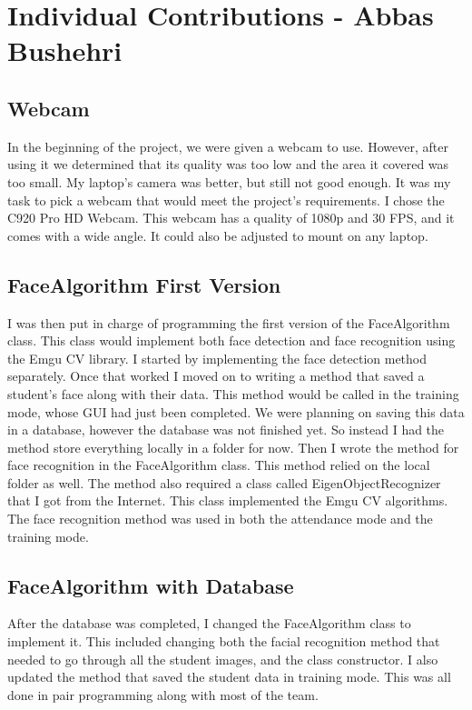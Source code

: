 \documentclass[12pt, a4paper]{article}
\begin{document}
\section{Individual Contributions - Abbas Bushehri}
\subsection{Webcam}
In the beginning of the project, we were given a webcam to use. However, after using it we determined that its quality was too low and the area it covered was too small. My laptop’s camera was better, but still not good enough. It was my task to pick a webcam that would meet the project’s requirements. I chose the C920 Pro HD Webcam. This webcam has a quality of 1080p and 30 FPS, and it comes with a wide angle. It could also be adjusted to mount on any laptop.

\subsection{FaceAlgorithm First Version}
I was then put in charge of programming the first version of the FaceAlgorithm class. This class would implement both face detection and face recognition using the Emgu CV library. I started by implementing the face detection method separately. Once that worked I moved on to writing a method that saved a student’s face along with their data. This method would be called in the training mode, whose GUI had just been completed. We were planning on saving this data in a database, however the database was not finished yet. So instead I had the method store everything locally in a folder for now. Then I wrote the method for face recognition in the FaceAlgorithm class. This method relied on the local folder as well. The method also required a class called EigenObjectRecognizer that I got from the Internet. This class implemented the Emgu CV algorithms. The face recognition method was used in both the attendance mode and the training mode.

\subsection{FaceAlgorithm with Database}
After the database was completed, I changed the FaceAlgorithm class to implement it. This included changing both the facial recognition method that needed to go through all the student images, and the class constructor. I also updated the method that saved the student data in training mode. This was all done in pair programming along with most of the team.
\end{document}
